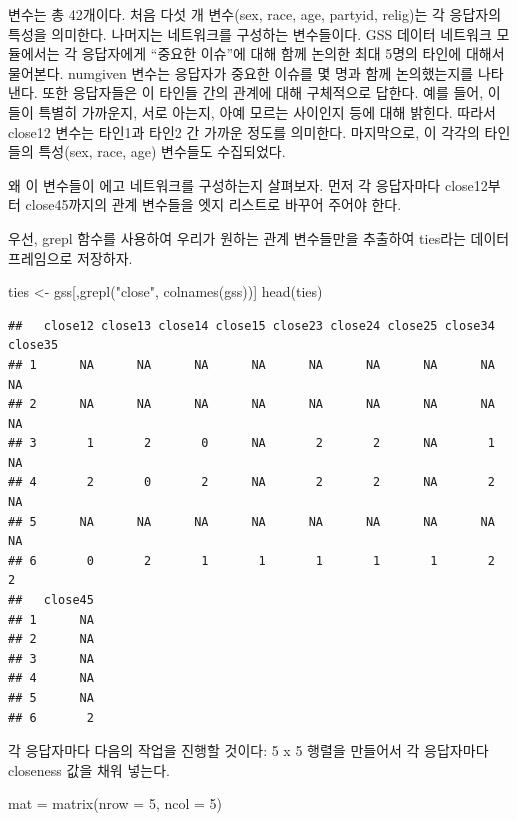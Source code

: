 \documentclass[
]{book}
\newenvironment{Shaded}{\begin{snugshade}}{\end{snugshade}}
\newcommand{\AttributeTok}[1]{\textcolor[rgb]{0.77,0.63,0.00}{#1}}
\newcommand{\DecValTok}[1]{\textcolor[rgb]{0.00,0.00,0.81}{#1}}
\newcommand{\FunctionTok}[1]{\textcolor[rgb]{0.00,0.00,0.00}{#1}}
\newcommand{\NormalTok}[1]{#1}
\newcommand{\OtherTok}[1]{\textcolor[rgb]{0.56,0.35,0.01}{#1}}
\newcommand{\StringTok}[1]{\textcolor[rgb]{0.31,0.60,0.02}{#1}}
\begin{document}
변수는 총 42개이다. 처음 다섯 개 변수(sex, race, age, partyid, relig)는 각 응답자의 특성을 의미한다. 나머지는 네트워크를 구성하는 변수들이다. GSS 데이터 네트워크 모듈에서는 각 응답자에게 ``중요한 이슈''에 대해 함께 논의한 최대 5명의 타인에 대해서 물어본다. numgiven 변수는 응답자가 중요한 이슈를 몇 명과 함께 논의했는지를 나타낸다. 또한 응답자들은 이 타인들 간의 관계에 대해 구체적으로 답한다. 예를 들어, 이들이 특별히 가까운지, 서로 아는지, 아예 모르는 사이인지 등에 대해 밝힌다. 따라서 close12 변수는 타인1과 타인2 간 가까운 정도를 의미한다. 마지막으로, 이 각각의 타인들의 특성(sex, race, age) 변수들도 수집되었다.

왜 이 변수들이 에고 네트워크를 구성하는지 살펴보자. 먼저 각 응답자마다 close12부터 close45까지의 관계 변수들을 엣지 리스트로 바꾸어 주어야 한다.

우선, grepl 함수를 사용하여 우리가 원하는 관계 변수들만을 추출하여 ties라는 데이터프레임으로 저장하자.

\begin{Shaded}
\begin{Highlighting}[]
\NormalTok{ties }\OtherTok{\textless{}{-}}\NormalTok{ gss[,}\FunctionTok{grepl}\NormalTok{(}\StringTok{"close"}\NormalTok{, }\FunctionTok{colnames}\NormalTok{(gss))]}
\FunctionTok{head}\NormalTok{(ties)}
\end{Highlighting}
\end{Shaded}

\begin{verbatim}
##   close12 close13 close14 close15 close23 close24 close25 close34 close35
## 1      NA      NA      NA      NA      NA      NA      NA      NA      NA
## 2      NA      NA      NA      NA      NA      NA      NA      NA      NA
## 3       1       2       0      NA       2       2      NA       1      NA
## 4       2       0       2      NA       2       2      NA       2      NA
## 5      NA      NA      NA      NA      NA      NA      NA      NA      NA
## 6       0       2       1       1       1       1       1       2       2
##   close45
## 1      NA
## 2      NA
## 3      NA
## 4      NA
## 5      NA
## 6       2
\end{verbatim}

각 응답자마다 다음의 작업을 진행할 것이다: 5 x 5 행렬을 만들어서 각 응답자마다 closeness 값을 채워 넣는다.

\begin{Shaded}
\begin{Highlighting}[]
\NormalTok{mat }\OtherTok{=} \FunctionTok{matrix}\NormalTok{(}\AttributeTok{nrow =} \DecValTok{5}\NormalTok{, }\AttributeTok{ncol =} \DecValTok{5}\NormalTok{)}
\end{Highlighting}
\end{Shaded}
\end{document}
